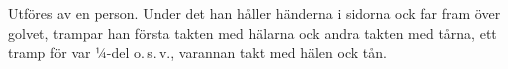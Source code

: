 \vspace{0.7cm}
Utföres av en person.
 Under det han håller händerna i sidorna ock far fram över golvet, trampar
 han första takten med hälarna ock andra takten med tårna, ett tramp för
 var ¼-del o.\,s.\,v., varannan takt med hälen ock tån.
\vspace{0.2cm}
